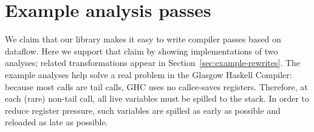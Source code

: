 \documentclass[blockstyle,preprint,natbib,nocopyrightspace]{sigplanconf}
\newcommand\secref[1]{Section~\ref{sec:#1}}
\newcommand\seclabel[1]{\label{sec:#1}}
\begin{document}
% 
% 
% 
% 




\section{Example analysis passes}

\seclabel{example-analyses}


We claim that our library
makes it easy to write compiler passes based on dataflow.
Here we support that claim by showing
implementations of two analyses;
related transformations appear in \secref{example-rewrites}. 
The example analyses help solve a real problem in the Glasgow Haskell
Compiler:
because most calls are tail calls, GHC uses no 
callee-saves registers.
Therefore, at each (rare) non-tail call, all live
variables must be spilled to the stack.
In order to reduce register pressure,
such variables are spilled as early as possible and reloaded as late as possible.
\end{document}
